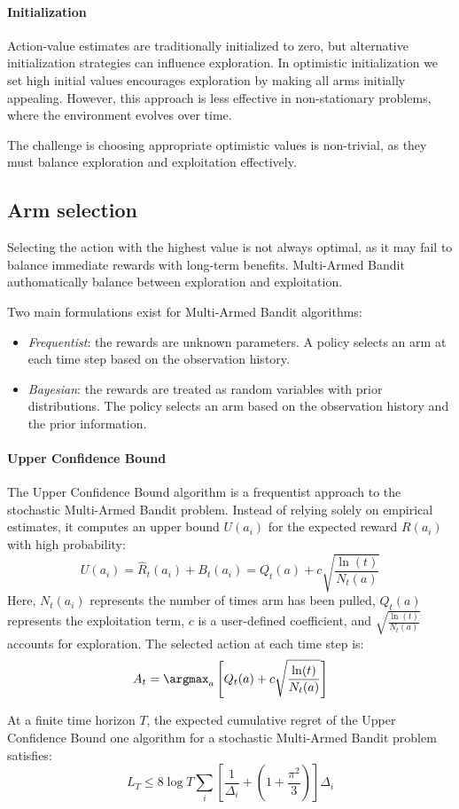 \paragraph*{Initialization}
Action-value estimates are traditionally initialized to zero, but alternative initialization strategies can influence exploration. 
In optimistic initialization we set high initial values encourages exploration by making all arms initially appealing. 
However, this approach is less effective in non-stationary problems, where the environment evolves over time.

The challenge is choosing appropriate optimistic values is non-trivial, as they must balance exploration and exploitation effectively.

\subsection{Arm selection}
Selecting the action with the highest value is not always optimal, as it may fail to balance immediate rewards with long-term benefits. 
Multi-Armed Bandit authomatically balance between exploration and exploitation. 

Two main formulations exist for Multi-Armed Bandit algorithms:
\begin{itemize}
    \item \textit{Frequentist}: the rewards are unknown parameters. 
        A policy selects an arm at each time step based on the observation history.
    \item \textit{Bayesian}: the rewards are treated as random variables with prior distributions. 
        The policy selects an arm based on the observation history and the prior information.
\end{itemize}

\paragraph*{Upper Confidence Bound}
The Upper Confidence Bound algorithm is a frequentist approach to the stochastic Multi-Armed Bandit problem. 
Instead of relying solely on empirical estimates, it computes an upper bound $U(a_i)$ for the expected reward $R(a_i)$ with high probability:
\[U(a_i) = \hat{R}_t(a_i) + B_t(a_i) =  Q_t(a) + c \sqrt{\frac{\ln(t)}{N_t(a)}} \]
Here, $N_t(a_i)$ represents the number of times arm has been pulled, $Q_t(a)$ represents the exploitation term, $c$ is a user-defined coefficient, and $\sqrt{\frac{\ln(t)}{N_t(a)}}$ accounts for exploration. 
The selected action at each time step is:
\[A_t = \argmax_a \left[ Q_t(a) + c \sqrt{\frac{\ln(t)}{N_t(a)}} \right]\]
\begin{theorem}
    At a finite time horizon $T$, the expected cumulative regret of the Upper Confidence Bound one algorithm for a stochastic Multi-Armed Bandit problem satisfies:
    \[L_T \leq 8 \log T \sum_{i} \left[ \frac{1}{\Delta_i} + \left( 1 + \frac{\pi^2}{3} \right)\right] \Delta_i\]
\end{theorem}

